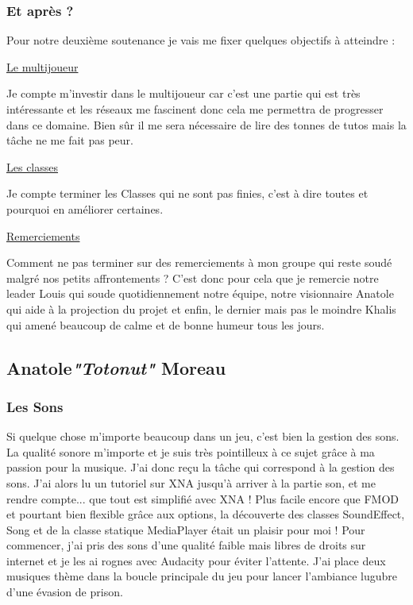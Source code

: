 \documentclass{article}
\begin{document}
\subsubsection{Et après ?}
\par
Pour notre deuxième soutenance je vais me fixer quelques objectifs à atteindre :
\newline

\par
\underline{Le multijoueur}
\newline
\par
Je compte m'investir dans le multijoueur car c'est une partie qui est très intéressante et les réseaux me fascinent donc cela me permettra de progresser dans ce domaine. Bien sûr il me sera nécessaire de lire des tonnes de tutos mais la tâche ne me fait pas peur.
\newline

\par
\underline{Les classes}
\newline
\par
Je compte terminer les Classes qui ne sont pas finies, c'est à dire toutes et pourquoi en améliorer certaines.
\newline

\par
\underline{Remerciements}
\newline
\par
Comment ne pas terminer sur des remerciements à mon groupe qui reste soudé malgré nos petits affrontements ? C'est donc pour cela que je remercie notre leader Louis qui soude quotidiennement notre équipe, notre visionnaire Anatole qui aide à la projection du projet et enfin, le dernier mais pas le moindre Khalis qui amené beaucoup de calme et de bonne humeur tous les jours.

\newpage

\subsection {Anatole\textcolor {pseudoblue} {\textit {"Totonut"}} Moreau}

\subsubsection{Les Sons}
Si quelque chose m'importe beaucoup dans un jeu, c'est bien la gestion des sons. La qualité sonore m'importe et je suis très pointilleux à ce sujet grâce à ma passion pour la musique. J'ai donc reçu la tâche qui correspond à la gestion des sons. J'ai alors lu un tutoriel sur XNA jusqu’à arriver à la partie son, et me rendre compte... que tout est simplifié avec XNA ! Plus facile encore que FMOD et pourtant bien flexible grâce aux options, la découverte des classes SoundEffect, Song et de la classe statique MediaPlayer était un plaisir pour moi ! Pour commencer, j'ai pris des sons d'une qualité faible mais libres de droits sur internet et je les ai rognes avec Audacity pour éviter l'attente. J'ai place deux musiques thème dans la boucle principale du jeu pour lancer l'ambiance lugubre d'une évasion de prison.
\end{document}

